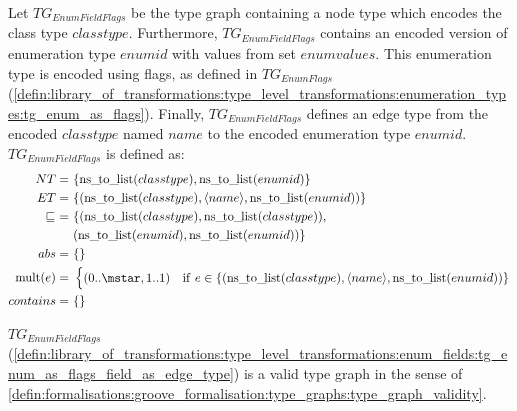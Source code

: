 \begin{defin}
\label{defin:library_of_transformations:type_level_transformations:enum_fields:tg_enum_as_flags_field_as_edge_type}
Let $TG_{EnumFieldFlags}$ be the type graph containing a node type which encodes the class type $classtype$.
Furthermore, $TG_{EnumFieldFlags}$ contains an encoded version of enumeration type $enumid$ with values from set $enumvalues$. This enumeration type is encoded using flags, as defined in $TG_{EnumFlags}$ (\cref{defin:library_of_transformations:type_level_transformations:enumeration_types:tg_enum_as_flags}). Finally, $TG_{EnumFieldFlags}$ defines an edge type from the encoded $classtype$ named $name$ to the encoded enumeration type $enumid$. $TG_{EnumFieldFlags}$ is defined as:
\begin{align*}
NT =\ &\{\mathrm{ns\_\!to\_\!list}(classtype), \mathrm{ns\_\!to\_\!list}(enumid)\}\\
ET =\ &\{(\mathrm{ns\_\!to\_\!list}(classtype), \langle name \rangle, \mathrm{ns\_\!to\_\!list}(enumid))\}\\
\!\!\sqsubseteq\ =\ &\{(\mathrm{ns\_\!to\_\!list}(classtype), \mathrm{ns\_\!to\_\!list}(classtype)),\ \\& (\mathrm{ns\_\!to\_\!list}(enumid), \mathrm{ns\_\!to\_\!list}(enumid))\}\\
abs =\ &\{\} \\
\mathrm{mult}(e) =\ &\begin{cases}
    (0..\mstar, 1..1) &\mathrm{if}\ e \in \{(\mathrm{ns\_\!to\_\!list}(classtype), \langle name \rangle, \mathrm{ns\_\!to\_\!list}(enumid))\}
\end{cases} \\
contains =\ &\{\}
\end{align*}
\end{defin}

\begin{thm}
\label{defin:library_of_transformations:type_level_transformations:enum_fields:tg_enum_as_flags_field_as_edge_type_correct}
$TG_{EnumFieldFlags}$ (\cref{defin:library_of_transformations:type_level_transformations:enum_fields:tg_enum_as_flags_field_as_edge_type}) is a valid type graph in the sense of \cref{defin:formalisations:groove_formalisation:type_graphs:type_graph_validity}.
\end{thm}

